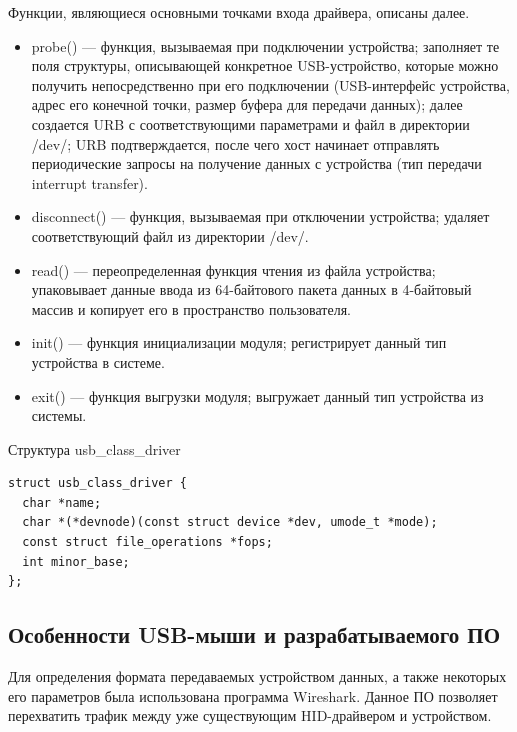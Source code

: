 Функции, являющиеся основными точками входа драйвера, описаны далее.

\begin{itemize}
	\item probe() --- функция, вызываемая при подключении устройства; заполняет те поля структуры, описывающей конкретное USB-устройство, которые можно получить непосредственно при его подключении (USB-интерфейс устройства, адрес его конечной точки, размер буфера для передачи данных); далее создается URB с соответствующими параметрами и файл в директории /dev/; URB подтверждается, после чего хост начинает отправлять периодические запросы на получение данных с устройства (тип передачи interrupt transfer).
	
	\item disconnect() --- функция, вызываемая при отключении устройства; удаляет соответствующий файл из директории /dev/.
	
	\item read() --- переопределенная функция чтения из файла устройства; упаковывает данные ввода из 64-байтового пакета данных в 4-байтовый массив и копирует его в пространство пользователя.
	
	\item init() --- функция инициализации модуля; регистрирует данный тип устройства в системе.
	
	\item exit() --- функция выгрузки модуля; выгружает данный тип устройства из системы.
\end{itemize}

\begin{longlisting}
	\singlespacing
	\caption{Структура usb\_class\_driver}
	\label{lst:usb_class_driver}
	\begin{verbatim}
struct usb_class_driver {
  char *name;
  char *(*devnode)(const struct device *dev, umode_t *mode);
  const struct file_operations *fops;
  int minor_base;
};
	\end{verbatim}
\end{longlisting}

\subsection{Особенности USB-мыши и разрабатываемого ПО}

Для определения формата передаваемых устройством данных, а также некоторых его параметров была использована программа Wireshark.
Данное ПО позволяет перехватить трафик между уже существующим HID-драйвером и устройством.

